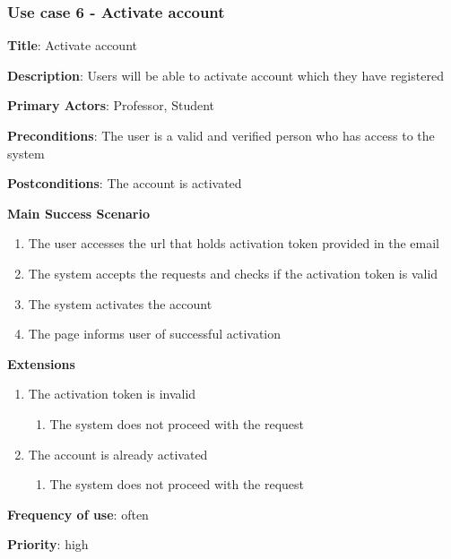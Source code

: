 \documentclass[singlespacing,12pt,parskip,headsepline,consistentlayout]{article}
\begin{document}
\subsubsection{Use case 6 - Activate account}
\begin{flushleft}
\vspace{0.2cm}
\hline
\vspace{0.2cm}
{\bfseries Title}: {Activate account}

{\bfseries Description}: {Users will be able to activate account which they have registered}

{\bfseries Primary Actors}: {Professor, Student}

{\bfseries Preconditions}: The user is a valid and verified person who has access to the system

{\bfseries Postconditions}: {The account is activated}

{\bfseries Main Success Scenario}

\begin{enumerate}
      \item The user accesses the url that holds activation token provided in the email
      \item The system accepts the requests and checks if the activation token is valid
      \item The system activates the account
      \item The page informs user of successful activation
\end{enumerate}
 
{\bfseries Extensions}

\begin{enumerate}
  \item The activation token is invalid
  \begin{enumerate}
      \item The system does not proceed with the request
  \end{enumerate}
  \item The account is already activated
  \begin{enumerate}
      \item The system does not proceed with the request
  \end{enumerate}
\end{enumerate}

{\bfseries Frequency of use}: often

{\bfseries Priority}: high

\end{flushleft}
\end{document}
